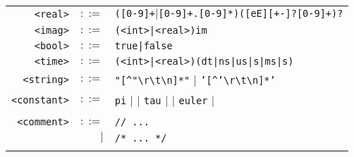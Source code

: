 \documentclass[notitlepage]{article}
\begin{document}
\begin{longtable}{rrl}
	\texttt{<real>} & $::=$ & \texttt{([0-9]+$\mid$[0-9]+.[0-9]*)([eE][+-]?[0-9]+)?} \\
	\texttt{<imag>} & $::=$ & \texttt{(<int>|<real>)im} \\
	\texttt{<bool>} & $::=$ & \texttt{true|false} \\
	\texttt{<time>} & $::=$ & \texttt{(<int>|<real>)(dt|ns|us|{\textmu}s|ms|s)} \\
	\texttt{<string>} & $::=$ & \texttt{"[\string^"{\textbackslash}r{\textbackslash}t{\textbackslash}n]*"} $\mid$ \texttt{'[\string^'{\textbackslash}r{\textbackslash}t{\textbackslash}n]*'} \\
	\texttt{<constant>} & $::=$ & \texttt{pi} $\mid$ \texttt{\textpi} $\mid$ \texttt{tau} $\mid$ \texttt{\texttau} $\mid$ \texttt{euler} $\mid$ \texttt{\textepsilon} \\ \\
	\texttt{<comment>} & $::=$ & \texttt{// ...} \\
	& $\mid$ & \texttt{/* ... */} \\ \\
\end{longtable}
\end{document}
